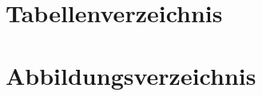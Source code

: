 \documentclass[oneside,11pt,parskip=half,ngerman]{scrreprt}
\begin{document}
\section{Tabellenverzeichnis}\label{tabellenverzeichnis}

\renewcommand{\listtablename}{} 

\begingroup \let\clearpage\relax
\listoftables
\endgroup

\section{Abbildungsverzeichnis}\label{abbildungsverzeichnis}

\renewcommand{\listfigurename}{} 

\begingroup\let\clearpage\relax
\listoffigures
\endgroup
\end{document}

